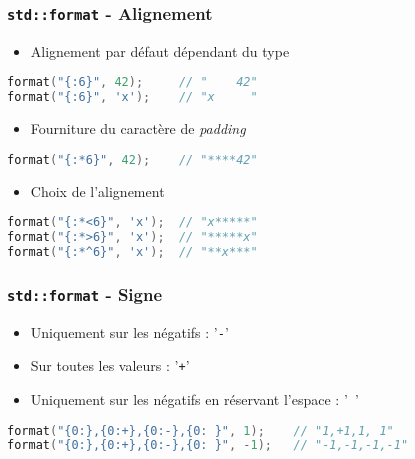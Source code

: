 \documentclass[C++.tex]{subfiles}
\begin{document}
\begin{frame}[fragile]
	\frametitle{\lstinline|std::format| - Alignement}
	\begin{itemize}
		\item Alignement par défaut dépendant du type
	\end{itemize}

	\begin{lstlisting}[language=C++]
format("{:6}", 42);    	// "    42"
format("{:6}", 'x');   	// "x     "\end{lstlisting}

	\begin{itemize}
		\item Fourniture du caractère de \textit{padding}
	\end{itemize}

	\begin{lstlisting}[language=C++]
format("{:*6}", 42);    // "****42"\end{lstlisting}

	\begin{itemize}
		\item Choix de l'alignement
	\end{itemize}

	\begin{lstlisting}[language=C++]
format("{:*<6}", 'x'); 	// "x*****"
format("{:*>6}", 'x'); 	// "*****x"
format("{:*^6}", 'x'); 	// "**x***"\end{lstlisting}
\end{frame}

\begin{frame}[fragile]
	\frametitle{\lstinline|std::format| - Signe}
	\begin{itemize}
		\item Uniquement sur les négatifs : '\lstinline|-|'


		\item Sur toutes les valeurs : '\lstinline|+|'
		\item Uniquement sur les négatifs en réservant l'espace : '\lstinline| |'
	\end{itemize}

	\begin{lstlisting}[language=C++]
format("{0:},{0:+},{0:-},{0: }", 1); 	// "1,+1,1, 1"
format("{0:},{0:+},{0:-},{0: }", -1);	// "-1,-1,-1,-1"\end{lstlisting}
\end{frame}
\end{document}
